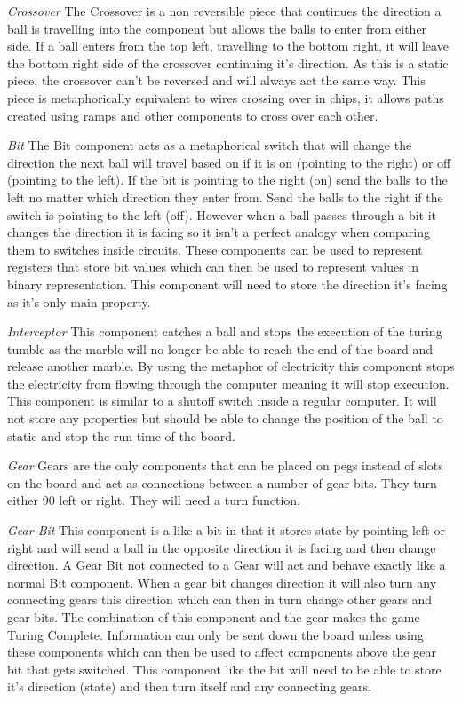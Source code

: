 \documentclass{l4proj}
\begin{document}
\emph{Crossover}
The Crossover is a non reversible piece that continues the direction a ball is travelling into the component but allows the balls to enter from either side.
If a ball enters from the top left, travelling to the bottom right, it will leave the bottom right side of the crossover continuing it's direction. As this is a 
static piece, the crossover can't be reversed and will always act the same way. This piece is metaphorically equivalent to wires crossing over in chips, it allows paths created 
using ramps and other components to cross over each other.

\emph{Bit}
The Bit component acts as a metaphorical switch that will change the direction the next ball will travel based on if it is on (pointing to the right) or off (pointing to the left).
If the bit is pointing to the right (on) send the balls to the left no matter which direction they enter from. Send the balls to the right if the switch is pointing to the left (off).
However when a ball passes through a bit it changes the direction it is facing so it isn't a perfect analogy when comparing them to switches inside circuits. These components can be used to represent registers
that store bit values which can then be used to represent values in binary representation.
This component will need to store the direction it's facing as it's only main property.

\emph{Interceptor}
This component catches a ball and stops the execution of the turing tumble as the marble will no longer be able to reach the end of the board and release another marble. 
By using the metaphor of electricity this component stops the electricity from flowing through the computer meaning it will stop execution.
This component is similar to a shutoff switch inside a regular computer. It will not store any properties but should be able to change the position of the ball to static and 
stop the run time of the board.

\emph{Gear}
Gears are the only components that can be placed on pegs instead of slots on the board and act as connections between a number of gear bits. They turn either 90 left or right. They will need a turn function.

\emph{Gear Bit}
This component is a like a bit in that it stores state by pointing left or right and will send a ball in the opposite direction it is facing and then change direction.
A Gear Bit not connected to a Gear will act and behave exactly like a normal Bit component. When a gear bit changes direction it will also turn any connecting gears this direction which can 
then in turn change other gears and gear bits. The combination of this component and the gear makes the game Turing Complete. 
Information can only be sent down the board unless using these components which can then be used to affect components above the gear bit that gets switched.
This component like the bit will need to be able to store it's direction (state) and then turn itself and any connecting gears.
\end{document}
